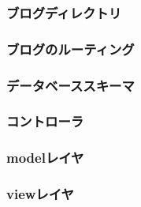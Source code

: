 
\subsubsection{ブログディレクトリ}

\subsubsection{ブログのルーティング}

\subsubsection{データベーススキーマ}

\subsubsection{コントローラ}

\subsubsection{modelレイヤ}

\subsubsection{viewレイヤ}

